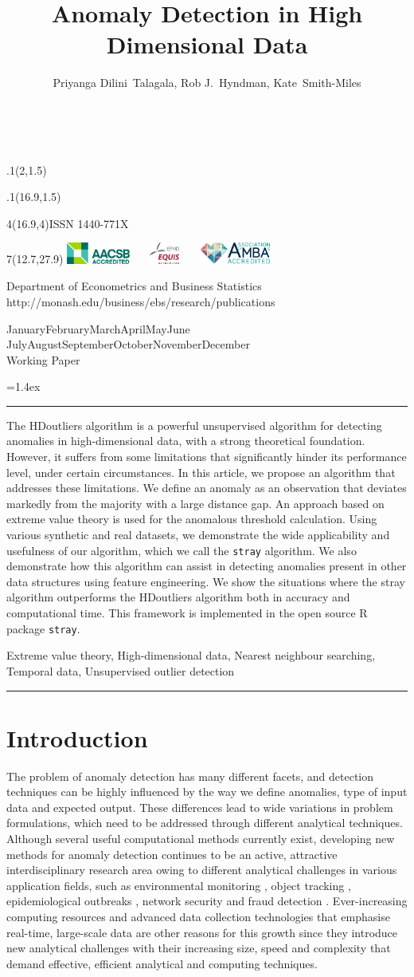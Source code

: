 \documentclass[11pt,a4paper,]{article}
\title{Anomaly Detection in High Dimensional Data}
\author{Priyanga Dilini~Talagala, Rob J.~Hyndman, Kate~Smith-Miles}
\date{\sf\Date~\Month~\Year}
\makeatletter
\def\Date{\number\day}
\def\Month{\ifcase\month\or
 January\or February\or March\or April\or May\or June\or
 July\or August\or September\or October\or November\or December\fi}
\def\Year{\number\year}
\def\showjel{{\large\textsf{\textbf{JEL classification:}}~\@jel}}
\def\cover{{\sffamily\setcounter{page}{0}
        \thispagestyle{empty}
        \placefig{2}{1.5}{width=5cm}{monash2}
        \placefig{16.9}{1.5}{width=2.1cm}{MBusSchool}
        \begin{textblock}{4}(16.9,4)ISSN 1440-771X\end{textblock}
        \begin{textblock}{7}(12.7,27.9)\hfill
        \includegraphics[height=0.7cm]{AACSB}~~~
        \includegraphics[height=0.7cm]{EQUIS}~~~
        \includegraphics[height=0.7cm]{AMBA}
        \end{textblock}
        \vspace*{2cm}
        \begin{center}\Large
        Department of Econometrics and Business Statistics\\[.5cm]
        \footnotesize http://monash.edu/business/ebs/research/publications
        \end{center}\vspace{2cm}
        \begin{center}
        \fbox{\parbox{14cm}{\begin{onehalfspace}\centering\Huge\vspace*{0.3cm}
                \textsf{\textbf{\expandafter{\@title}}}\vspace{1cm}\par
                \LARGE\@author\end{onehalfspace}
        }}
        \end{center}
        \vfill
                \begin{center}\Large
                \Month~\Year\\[1cm]
                Working Paper \@wp
        \end{center}\vspace*{2cm}}}
\def\pageone{{\sffamily\setstretch{1}%
        \thispagestyle{empty}%
        \vbox to \textheight{%
        \raggedright\baselineskip=1.2cm
     {\fontsize{24.88}{30}\sffamily\textbf{\expandafter{\@title}}}
        \vspace{2cm}\par
        \hspace{1cm}\parbox{14cm}{\sffamily\large\@addresses}\vspace{1cm}\vfill
        \hspace{1cm}{\large\Date~\Month~\Year}\\[1cm]
        \hspace{1cm}\showjel\vss}}}
\def\blindtitle{{\sffamily
     \thispagestyle{plain}\raggedright\baselineskip=1.2cm
     {\fontsize{24.88}{30}\sffamily\textbf{\expandafter{\@title}}}\vspace{1cm}\par
        }}
\def\titlepage{{\cover\newpage\pageone\newpage\blindtitle}}
\let\maketitle\titlepage
\newenvironment{keywords}{\par\vspace{0.5cm}\noindent{\sffamily\textbf{Keywords:}}}{\vspace{0.25cm}\par\hrule\vspace{0.5cm}\par}
\renewenvironment{abstract}{\begin{minipage}{\textwidth}\parskip=1.4ex\noindent
\hrule\vspace{0.1cm}\par{\sffamily\textbf{\abstractname}}\newline}
  {\end{minipage}}
\def\placefig#1#2#3#4{\begin{textblock}{.1}(#1,#2)\rlap{\texttt{[image: \#4]}}\end{textblock}}
\theoremstyle{definition}
\theoremstyle{definition}
\theoremstyle{definition}
\theoremstyle{remark}
\makeatother
\begin{document}
\maketitle
\begin{abstract}
The HDoutliers algorithm is a powerful unsupervised algorithm for detecting anomalies in high-dimensional data, with a strong theoretical foundation. However, it suffers from some limitations that significantly hinder its performance level, under certain circumstances. In this article, we propose an algorithm that addresses these limitations. We define an anomaly as an observation that deviates markedly from the majority with a large distance gap. An approach based on extreme value theory is used for the anomalous threshold calculation. Using various synthetic and real datasets, we demonstrate the wide applicability and usefulness of our algorithm, which we call the \texttt{stray} algorithm. We also demonstrate how this algorithm can assist in detecting anomalies present in other data structures using feature engineering. We show the situations where the stray algorithm outperforms the HDoutliers algorithm both in accuracy and computational time. This framework is implemented in the open source R package \texttt{stray}.
\end{abstract}
\begin{keywords}
Extreme value theory, High-dimensional data, Nearest neighbour searching, Temporal data, Unsupervised outlier detection
\end{keywords}

\hypertarget{introduction}{%
\section{Introduction}\label{introduction}}

The problem of anomaly detection has many different facets, and detection techniques can be highly influenced by the way we define anomalies, type of input data and expected output. These differences lead to wide variations in problem formulations, which need to be addressed through different analytical techniques. Although several useful computational methods currently exist, developing new methods for anomaly detection continues to be an active, attractive interdisciplinary research area owing to different analytical challenges in various application fields, such as environmental monitoring \autocites{talagala2019feature}[ ]{leigh2019framework}, object tracking \autocite{gupta2014outliersurvey,sundaram2009aircraft}, epidemiological outbreaks \autocite{gupta2014outliersurvey}, network security \autocite{hyndman2015large,cao2015targetvue} and fraud detection \autocite{talagala2019anomaly}. Ever-increasing computing resources and advanced data collection technologies that emphasise real-time, large-scale data are other reasons for this growth since they introduce new analytical challenges with their increasing size, speed and complexity that demand effective, efficient analytical and computing techniques.
\end{document}
